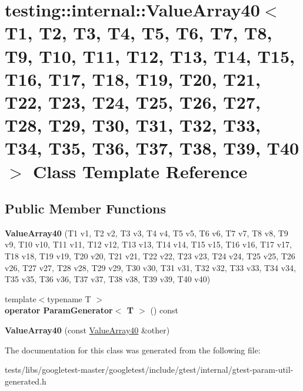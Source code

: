 \hypertarget{classtesting_1_1internal_1_1ValueArray40}{}\section{testing\+:\+:internal\+:\+:Value\+Array40$<$ T1, T2, T3, T4, T5, T6, T7, T8, T9, T10, T11, T12, T13, T14, T15, T16, T17, T18, T19, T20, T21, T22, T23, T24, T25, T26, T27, T28, T29, T30, T31, T32, T33, T34, T35, T36, T37, T38, T39, T40 $>$ Class Template Reference}
\label{classtesting_1_1internal_1_1ValueArray40}
\subsection*{Public Member Functions}
\begin{DoxyCompactItemize}
\item 
\mbox{\label{classtesting_1_1internal_1_1ValueArray40_ac996d5485058f78f8f9ca524af1a111e}} 
{\bfseries Value\+Array40} (T1 v1, T2 v2, T3 v3, T4 v4, T5 v5, T6 v6, T7 v7, T8 v8, T9 v9, T10 v10, T11 v11, T12 v12, T13 v13, T14 v14, T15 v15, T16 v16, T17 v17, T18 v18, T19 v19, T20 v20, T21 v21, T22 v22, T23 v23, T24 v24, T25 v25, T26 v26, T27 v27, T28 v28, T29 v29, T30 v30, T31 v31, T32 v32, T33 v33, T34 v34, T35 v35, T36 v36, T37 v37, T38 v38, T39 v39, T40 v40)
\item 
\mbox{\label{classtesting_1_1internal_1_1ValueArray40_a7724f1715ba48a26ca123bcd397ba85a}} 
{\footnotesize template$<$typename T $>$ }\\{\bfseries operator Param\+Generator$<$ T $>$} () const
\item 
\mbox{\label{classtesting_1_1internal_1_1ValueArray40_a45a7a96acb5cc23a866bfa67dc7387c6}} 
{\bfseries Value\+Array40} (const \hyperlink{classtesting_1_1internal_1_1ValueArray40}{Value\+Array40} \&other)
\end{DoxyCompactItemize}


The documentation for this class was generated from the following file\+:\begin{DoxyCompactItemize}
\item 
tests/libs/googletest-\/master/googletest/include/gtest/internal/gtest-\/param-\/util-\/generated.\+h\end{DoxyCompactItemize}
